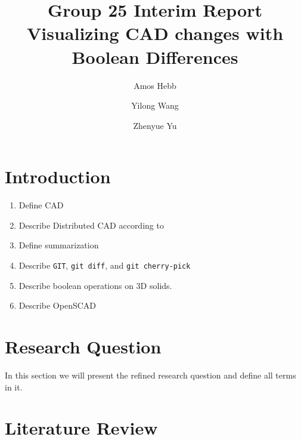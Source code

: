 \documentclass[sigconf,authorversion,nonacm]{acmart}
\begin{document}
\title{Group 25 Interim Report\\Visualizing CAD changes with Boolean Differences}

\author{Amos Hebb}
\author{Yilong Wang}
\author{Zhenyue Yu}
\makeatletter
\def\@ACM@checkaffil{%
	\if@ACM@instpresent\else
		\ClassWarningNoLine{\@classname}{No institution present for an affiliation}%
	\fi
	\if@ACM@citypresent\else
		\ClassWarningNoLine{\@classname}{No city present for an affiliation}%
	\fi
	\if@ACM@countrypresent\else
		\ClassWarningNoLine{\@classname}{No country present for an affiliation}%
	\fi
}
\makeatother

\maketitle

\section{Introduction}


\begin{enumerate}
	\item Define CAD
	\item Describe Distributed CAD according to \citet{cheng2023age}
	\item Define summarization
	\item Describe \texttt{GIT}, \texttt{git diff}, and \texttt{git cherry-pick}
	\item Describe boolean operations on 3D solids.
	\item Describe OpenSCAD
\end{enumerate}

\section{Research Question}

In this section we will present the refined research question and define all terms in it.

\section{Literature Review}
\end{document}
